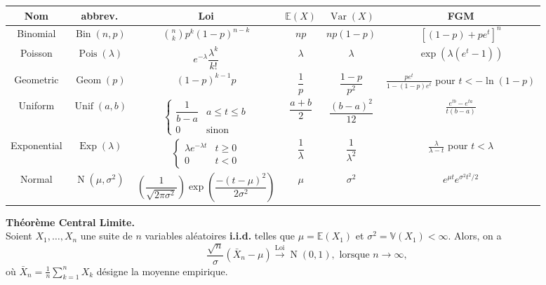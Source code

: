 \documentclass[11pt, addpoints, answers]{exam}
\def\Bin{\operatorname{Bin}}
\def\Var{\operatorname{Var}}
\def\Geom{\operatorname{Geom}}
\def\Pois{\operatorname{Pois}}
\def\Exp{\operatorname{Exp}}
\def\Unif{\operatorname{Unif}}
\def\No{\operatorname{N}}
\newcommand{\E}{\mathbb E}            %
\def\Var{\operatorname{Var}}
\begin{document}
\renewcommand\arraystretch{3.5}
\begin{table}[H]
\begin{center}
\footnotesize
\begin{tabular}{|c|c|c|c|c|c|}

\hline
Nom & abbrev. & Loi & $\E(X)$ & $\Var(X)$ & FGM\\
\hline\hline
Binomial & $\Bin(n,p)$ & $\binom{n}{k}p^k(1-p)^{n-k}$ & $np$ & $np(1-p)$ & $[(1-p)+pe^t]^n$\\
\hline
Poisson & $\Pois(\lambda)$ & $e^{-\lambda}\dfrac{\lambda^k}{k!}$ & $\lambda$ & $\lambda$ &$ \exp(\lambda(e^t-1))$\\
\hline
Geometric & $\Geom(p)$ & $(1-p)^{k-1}p$ & $\dfrac{1}{p}$ & $\dfrac{1-p}{p^2}$ & $\frac{pe^t}{1-(1-p)e^t}$ pour  $t<-\ln(1-p)$\\
\hline
Uniform & $\Unif(a,b)$ & $\begin{cases} \dfrac{1}{b-a} & a\leq t\leq b\\ 0 & \text{sinon}\end{cases}
$ & $\dfrac{a+b}{2}$ & $\dfrac{(b-a)^2}{12}$ & $\frac{e^{tb}-e^{ta}}{t(b-a)}$\\
\hline
Exponential & $\Exp(\lambda)$ & $\begin{cases} \lambda e^{-\lambda t} & t\geq 0 \\ 0 & t<0\end{cases}$ & $\dfrac{1}{\lambda}$ & $\dfrac{1}{\lambda^2}$ & $\frac{\lambda}{\lambda -t}$ pour $t<\lambda$\\
\hline
Normal & $\No(\mu,\sigma^2)$ & $\left(\dfrac{1}{\sqrt{2\pi\sigma^2}}\right)\operatorname{exp}{\left(\dfrac{-(t-\mu)^2}{2\sigma^2}\right)}$ & $\mu$ & $\sigma^2$ & $e^{\mu t}e^{\sigma^2t^2/2}$\\
\hline
\end{tabular}
\end{center}
\end{table}%

\textbf{Théorème Central Limite.}\\
Soient $X_1,\ldots,X_n$ une suite de $n$ variables aléatoires \textbf{i.i.d.} telles que $\mu =\mathbb{E}(X_1)$ et $\sigma^{2} =\mathbb{V}(X_1)<\infty$. Alors, on a
$$
\frac{\sqrt{n}}{\sigma}(\bar{X}_n-\mu)\overset{\text{Loi}}{\rightarrow}\No(0,1),\text{ lorsque }n\rightarrow\infty,
$$
où $\bar{X}_n=\frac{1}{n}\sum_{k=1}^{n}X_k$ désigne la moyenne empirique.
\end{document}
